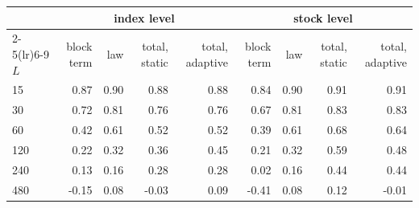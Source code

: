 \begin{tabular}{lrrrrrrrr}
\toprule
& \multicolumn{4}{c}{index level} & \multicolumn{4}{c}{stock level} \\
\cmidrule(lr){2-5}\cmidrule(lr){6-9}
$L$ & block term & law & total, static & total, adaptive & block term & law & total, static & total, adaptive \\
\midrule
15 & 0.87 & 0.90 & 0.88 & 0.88 & 0.84 & 0.90 & 0.91 & 0.91 \\
30 & 0.72 & 0.81 & 0.76 & 0.76 & 0.67 & 0.81 & 0.83 & 0.83 \\
60 & 0.42 & 0.61 & 0.52 & 0.52 & 0.39 & 0.61 & 0.68 & 0.64 \\
120 & 0.22 & 0.32 & 0.36 & 0.45 & 0.21 & 0.32 & 0.59 & 0.48 \\
240 & 0.13 & 0.16 & 0.28 & 0.28 & 0.02 & 0.16 & 0.44 & 0.44 \\
480 & -0.15 & 0.08 & -0.03 & 0.09 & -0.41 & 0.08 & 0.12 & -0.01 \\
\bottomrule
\end{tabular}
